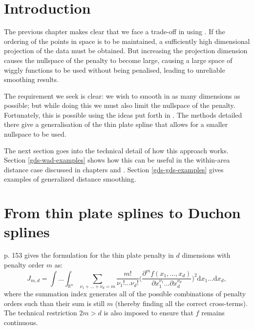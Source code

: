 
\label{chap-gds}


\section{Introduction}

The previous chapter makes clear that we face a trade-off in using \mdsap. If the ordering of the points in space is to be maintained, a sufficiently high dimensional projection of the data must be obtained. But increasing the projection dimension causes the nullspace of the penalty to become large, causing a large space of wiggly functions to be used without being penalised, leading to unreliable smoothing results. 

The requirement we seek is clear: we wish to smooth in as many dimensions as possible; but while doing this we must also limit the nullspace of the penalty. Fortunately, this is possible using the ideas put forth in \cite{duchon77}. The methods detailed there give a generalisation of the thin plate spline that allows for a smaller nullspace to be used.

The next section goes into the technical detail of how this approach works. Section \ref{gds-wad-examples} shows how this can be useful in the within-area distance case discussed in chapters \label{chap-sc} and \label{chap-mds}. Section \ref{gds-gds-examples} gives examples of generalized distance smoothing.

\section{From thin plate splines to Duchon splines}

\cite{simonbook} p. 153 gives the formulation for the thin plate penalty in $d$ dimensions with penalty order $m$ as:
\begin{equation}
J_{m,d} = \int \ldots \int_{\mathbb{R}^n} \sum_{\nu_1 + \dots + \nu_d=m} \frac{m!}{\nu_1! \dots \nu_d!}\Big( \frac{\partial^m f(x_1,\dots,x_d)}{\partial x_1^{\nu_1} \ldots  \partial x_d^{\nu_d}} \Big)^2 \text{d} x_1 \ldots  \text{d} x_d,
\label{tprs-pen}
\end{equation}
where the summation index generates all of the possible combinations of penalty orders such than their sum is still $m$ (thereby finding all the correct cross-terms). The technical restriction $2m>d$ is also imposed to ensure that $f$ remains continuous.

